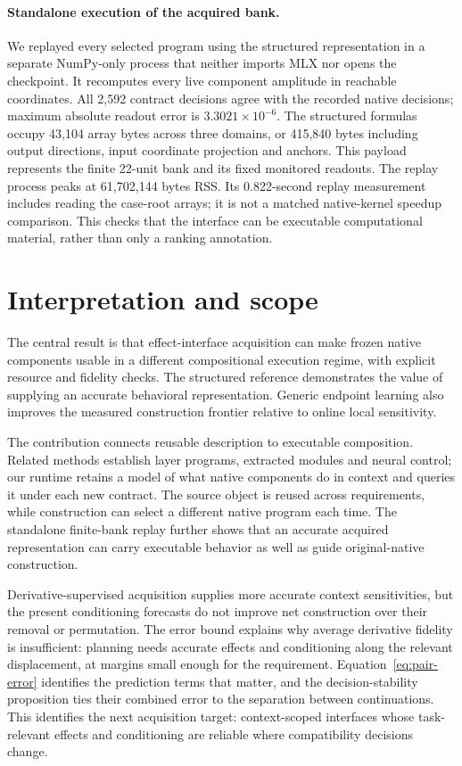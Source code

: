 \documentclass[11pt]{article}
\begin{document}
\paragraph{Standalone execution of the acquired bank.}
We replayed every selected program using the structured representation in a
separate NumPy-only process that neither imports MLX nor opens the checkpoint.
It recomputes every live component amplitude in reachable coordinates.
All 2,592 contract decisions agree with the recorded native decisions; maximum
absolute readout error is $3.3021\times10^{-6}$. The structured formulas occupy
43,104 array bytes across three domains, or 415,840 bytes including output
directions, input coordinate projection and anchors. This payload represents
the finite 22-unit bank and its fixed monitored readouts. The replay process
peaks at 61,702,144 bytes RSS. Its 0.822-second replay measurement includes
reading the case-root arrays; it is not a matched native-kernel speedup
comparison. This checks that the interface can be executable computational
material, rather than only a ranking annotation.

\section{Interpretation and scope}
The central result is that effect-interface acquisition can make frozen native
components usable in a different compositional execution regime, with explicit
resource and fidelity checks. The structured reference demonstrates the value
of supplying an accurate behavioral representation. Generic endpoint learning
also improves the measured construction frontier relative to online local
sensitivity.

The contribution connects reusable description to executable composition.
Related methods establish layer programs, extracted modules and neural control;
our runtime retains a model of what native components do in context and queries
it under each new contract. The source object is reused across requirements,
while construction can select a different native program each time. The
standalone finite-bank replay further shows that an accurate acquired
representation can carry executable behavior as well as guide original-native
construction.

Derivative-supervised acquisition supplies more accurate context sensitivities,
but the present conditioning forecasts do not improve net construction over
their removal or permutation. The error bound explains why average derivative
fidelity is insufficient: planning needs accurate effects and conditioning along
the relevant displacement, at margins small enough for the requirement.
Equation~\ref{eq:pair-error} identifies the prediction terms that matter, and
the decision-stability proposition ties their combined error to the separation
between continuations. This identifies the next acquisition target:
context-scoped interfaces whose task-relevant effects and conditioning are
reliable where compatibility decisions change.
\end{document}
